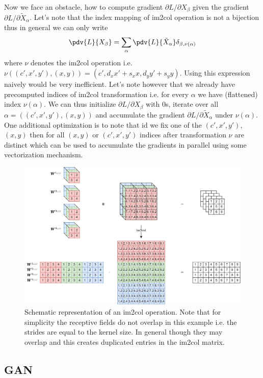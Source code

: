 \documentclass[a5paper]{article}
\begin{document}
Now we face an obstacle, how to compute gradient $\partial{L}/\partial{X_{\beta}}$ given the
gradient $\partial{L}/\partial{\tilde{X}_{\alpha}}$. Let's note that the index mapping of im2col
operation is not a bijection thus in general we can only write
\[
   \pdv{L}{X_\beta} = \sum_{\alpha} \pdv{L}{\tilde{X}_\alpha} \delta_{\beta, \nu(\alpha)}
\]
where $\nu$ denotes the im2col operation i.e. $\nu((c',x',y'), (x,y)) = (c', d_xx' + s_xx, d_yy' +
s_yy)$. Using this expression naively would be very inefficient. Let's note however that we already
have precomputed indices of im2col transformation i.e. for every $\alpha$ we have (flattened) index
$\nu(\alpha)$. We can thus initialize $\partial{L}/\partial{X_\beta}$ with 0s, iterate over all
$\alpha = ((c',x',y'), (x,y))$ and accumulate the gradient $\partial{L}/\partial{\tilde{X}_\alpha}$
under $\nu(\alpha)$. One additional optimization is to note that id we fix one of the $(c',x',y')$,
$(x,y)$ then for all $(x,y)$ or $(c',x',y')$ indices after transformation $\nu$ are distinct which
can be used to accumulate the gradients in parallel using some vectorization mechanism.

\begin{figure}[ht]
   \centering
   \includegraphics[width=0.95\columnwidth]{figs/im2col.png}
   \caption{Schematic representation of an im2col operation. Note that for simplicity the receptive 
   fields do not overlap in this example i.e. the strides are equal to the kernel size. In general
   though they may overlap and this creates duplicated entries in the im2col matrix.}
   \label{fig:im2col}
\end{figure}


\subsection{GAN}
\end{document}
